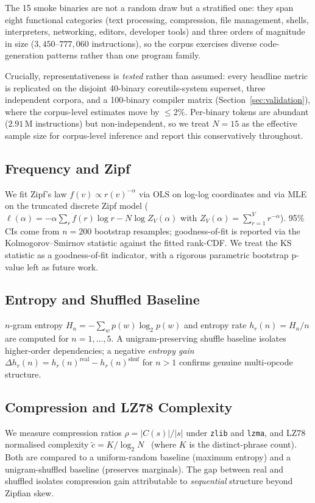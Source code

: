 \documentclass[conference]{IEEEtran}
\newcommand{\hr}[1]{h_r(#1)}
\newcommand{\zlib}{\texttt{zlib}}
\newcommand{\lzma}{\texttt{lzma}}
\begin{document}
The 15 smoke binaries are not a random draw but a stratified one: they
span eight functional categories (text processing, compression, file
management, shells, interpreters, networking, editors, developer tools)
and three orders of magnitude in size ($3{,}450$--$777{,}060$
instructions), so the corpus exercises diverse code-generation patterns
rather than one program family.

Crucially, representativeness is
\emph{tested} rather than assumed: every headline metric is replicated on
the disjoint 40-binary coreutils-system superset, three independent
corpora, and a 100-binary compiler matrix
(Section~\ref{sec:validation}), where the corpus-level estimates move by
${\leq}2\%$.  Per-binary tokens are abundant ($2.91$\,M instructions)
but non-independent, so we treat $N{=}15$ as the effective sample size for
corpus-level inference and report this conservatively throughout.

\subsection{Frequency and Zipf}
We fit Zipf's law $f(v)\propto r(v)^{-\alpha}$ via OLS on log-log
coordinates and via MLE on the truncated discrete Zipf model
($\ell(\alpha){=}-\alpha\sum_r f(r)\log r - N\log Z_V(\alpha)$ with
$Z_V(\alpha){=}\sum_{r=1}^V r^{-\alpha}$).  95\% CIs come from
$n{=}200$ bootstrap resamples; goodness-of-fit is reported via the
Kolmogorov--Smirnov statistic against the fitted rank-CDF.  We treat the
KS statistic as a goodness-of-fit indicator, with a rigorous parametric
bootstrap p-value left as future work.

\subsection{Entropy and Shuffled Baseline}
$n$-gram entropy $H_n{=}-\sum_w p(w)\log_2 p(w)$ and entropy rate
$\hr{n}{=}H_n/n$ are computed for $n{=}1,\dots,5$.  A unigram-preserving
shuffle baseline isolates higher-order dependencies; a negative
\emph{entropy gain} $\Delta\hr{n}{=}\hr{n}^{\text{real}}-\hr{n}^{\text{shuf}}$
for $n{>}1$ confirms genuine multi-opcode structure.

\subsection{Compression and LZ78 Complexity}
We measure compression ratios $\rho{=}|C(s)|/|s|$ under \zlib{} and
\lzma{}, and LZ78 normalised complexity
$\tilde{c}{=}K/\log_2 N$~\cite{ziv1978compression} (where $K$ is the
distinct-phrase count).  Both are compared to a uniform-random baseline
(maximum entropy) and a unigram-shuffled baseline (preserves marginals).
The gap between real and shuffled isolates compression gain attributable
to \emph{sequential} structure beyond Zipfian skew.
\end{document}
